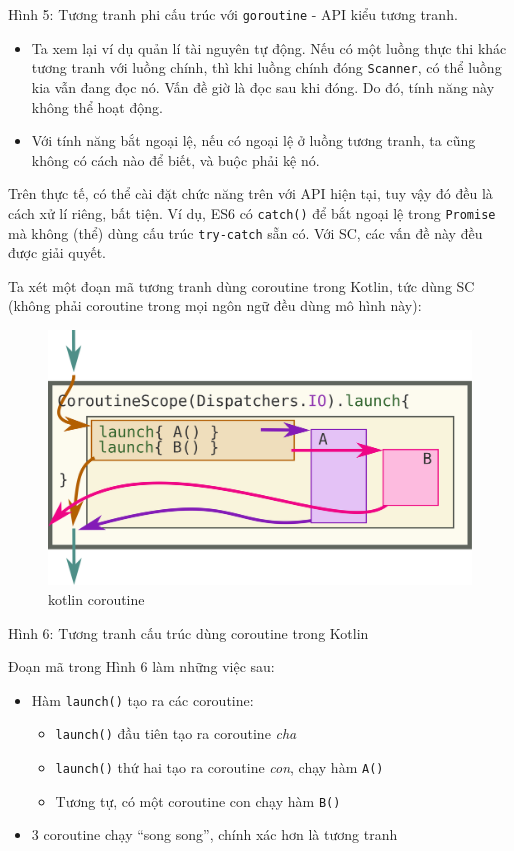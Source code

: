 \documentclass[
]{article}
\providecommand{\tightlist}{%
  \setlength{\itemsep}{0pt}\setlength{\parskip}{0pt}}
\begin{document}
Hình 5: Tương tranh phi cấu trúc với \texttt{goroutine} - API kiểu tương
tranh.

\begin{itemize}
\tightlist
\item
  Ta xem lại ví dụ quản lí tài nguyên tự động. Nếu có một luồng thực thi
  khác tương tranh với luồng chính, thì khi luồng chính đóng
  \texttt{Scanner}, có thể luồng kia vẫn đang đọc nó. Vấn đề giờ là đọc
  sau khi đóng. Do đó, tính năng này không thể hoạt động.
\item
  Với tính năng bắt ngoại lệ, nếu có ngoại lệ ở luồng tương tranh, ta
  cũng không có cách nào để biết, và buộc phải kệ nó.
\end{itemize}

Trên thực tế, có thể cài đặt chức năng trên với API hiện tại, tuy vậy đó
đều là cách xử lí riêng, bất tiện. Ví dụ, ES6 có \texttt{catch()} để bắt
ngoại lệ trong \texttt{Promise} mà không (thể) dùng cấu trúc
\texttt{try-catch} sẵn có. Với SC, các vấn đề này đều được giải quyết.

Ta xét một đoạn mã tương tranh dùng coroutine trong Kotlin, tức dùng SC
(không phải coroutine trong mọi ngôn ngữ đều dùng mô hình này):

\begin{figure}
\centering
\includegraphics{../images/kotlin-coroutine.svg}
\caption{kotlin coroutine}
\end{figure}

Hình 6: Tương tranh cấu trúc dùng coroutine trong Kotlin

Đoạn mã trong Hình 6 làm những việc sau:

\begin{itemize}
\item
  Hàm \texttt{launch()} tạo ra các coroutine:

  \begin{itemize}
  \tightlist
  \item
    \texttt{launch()} đầu tiên tạo ra coroutine \emph{cha}
  \item
    \texttt{launch()} thứ hai tạo ra coroutine \emph{con}, chạy hàm
    \texttt{A()}
  \item
    Tương tự, có một coroutine con chạy hàm \texttt{B()}
  \end{itemize}
\item
  3 coroutine chạy ``song song'', chính xác hơn là tương tranh
\end{itemize}
\end{document}
